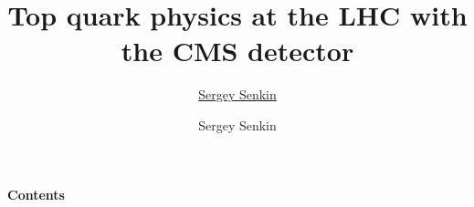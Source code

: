 \documentclass[oneside,12pt]{Classes/PhDThesis}
\title{Top quark physics at the LHC with the CMS detector  \\[1ex]
        }
\author{\href{mailto:sergey.senkin@bristol.ac.uk}{Sergey Senkin}}
\author{Sergey Senkin}
\begin{document}



\maketitle

\setcounter{secnumdepth}{3}
\setcounter{tocdepth}{3}

\frontmatter %
%
%
%



\makeatletter
\fancyhf{}
\renewcommand{\headrulewidth}{0pt}
\renewcommand{\footrulewidth}{0pt}
{\Huge \bfseries Contents \par}
\vspace{1cm}
\makeatother


\mainmatter %
\doublespacing









\backmatter %
%

%

%
\renewcommand{\bibname}{References} %
\end{document}
